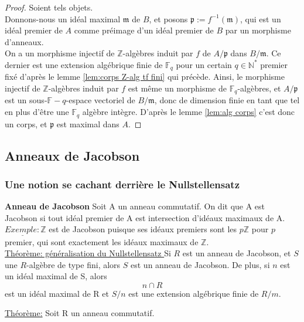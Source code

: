 \documentclass[10pt, twoside]{article}
\theoremstyle{plain}
\theoremstyle{definition}
\theoremstyle{plain}
\theoremstyle{plain}
\theoremstyle{definition}
\theoremstyle{remark}
\begin{document}
\begin{proof}
    Soient tels objets.\\
    Donnons-nous un idéal maximal $\mathfrak{m}$ de $B$, et posons $\mathfrak{p} := f^{-1}(\mathfrak{m})$, qui est un idéal premier de $A$ comme préimage d'un idéal premier de $B$ par un morphisme d'anneaux.\\
    On a un morphisme injectif de $\mathbb{Z}$-algèbres induit par $f$ de $A/\mathfrak{p}$ dans $B/\mathfrak{m}$. Ce dernier est une extension algébrique finie de $\mathbb{F}_q$ pour un certain $q \in \mathbb{N}^*$ premier fixé d'après le lemme \ref{lem:corps Z-alg tf fini} qui précède. Ainsi, le morphisme injectif de $\mathbb{Z}$-algèbres induit par $f$ est même un morphisme de $\mathbb{F}_q$-algèbres, et $A/\mathfrak{p}$ est un sous-$\mathbb{F}-q$-espace vectoriel de $B/\mathfrak{m}$, donc de dimension finie en tant que tel en plus d'être une $\mathbb{F}_q$ algèbre intègre. D'après le lemme \ref{lem:alg corps} c'est donc un corps, et $\mathfrak{p}$ est maximal dans $A$.
\end{proof}


\subsection{Anneaux de Jacobson}

\subsubsection{Une notion se cachant derrière le Nullstellensatz}

\textbf{Anneau de Jacobson}
Soit A un anneau commutatif. On dit que A est Jacobson si tout idéal premier de A est intersection d'idéaux maximaux de A.
\\
$\underline{Exemple:} \mathbb{Z}$ est de Jacobson puisque ses idéaux premiers sont les $p\mathbb{Z}$ pour $p$ premier, qui sont exactement les idéaux maximaux de $\mathbb{Z}$.
\\
\underline{Théorème: généralisation du Nullstellensatz }Si $R$ est un anneau de Jacobson, et $S$ une $R$-algèbre de type fini, alors $S$ est un anneau de Jacobson. De plus, si $n$ est un idéal maximal de S, alors $$n \cap R$$ est un idéal maximal de R et $S/n$ est une extension algébrique finie de $R/m$.


\underline{Théorème:}
Soit R un anneau commutatif.
\\
\end{document}
